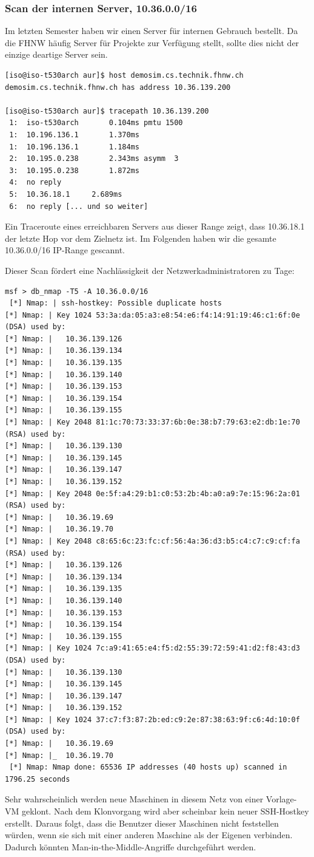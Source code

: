 \documentclass[a4paper,11pt]{scrartcl}
\begin{document}
\subsubsection{Scan der internen Server, 10.36.0.0/16}
Im letzten Semester haben wir einen Server für internen Gebrauch bestellt. Da die FHNW häufig Server für Projekte zur Verfügung stellt, sollte dies nicht der einzige deartige Server sein.
\begin{lstlisting}
[iso@iso-t530arch aur]$ host demosim.cs.technik.fhnw.ch
demosim.cs.technik.fhnw.ch has address 10.36.139.200

[iso@iso-t530arch aur]$ tracepath 10.36.139.200
 1:  iso-t530arch		0.104ms pmtu 1500
 1:  10.196.136.1		1.370ms 
 1:  10.196.136.1		1.184ms
 2:  10.195.0.238		2.343ms asymm  3 
 3:  10.195.0.238		1.872ms 
 4:  no reply
 5:  10.36.18.1		2.689ms 
 6:  no reply [... und so weiter]
\end{lstlisting}
Ein Traceroute eines erreichbaren Servers aus dieser Range zeigt, dass 10.36.18.1 der letzte Hop vor dem Zielnetz ist. Im Folgenden haben wir die gesamte 10.36.0.0/16 IP-Range gescannt.

Dieser Scan fördert eine Nachlässigkeit der Netzwerkadministratoren zu Tage:
\begin{lstlisting}
msf > db_nmap -T5 -A 10.36.0.0/16
 [*] Nmap: | ssh-hostkey: Possible duplicate hosts
[*] Nmap: | Key 1024 53:3a:da:05:a3:e8:54:e6:f4:14:91:19:46:c1:6f:0e (DSA) used by:
[*] Nmap: |   10.36.139.126
[*] Nmap: |   10.36.139.134
[*] Nmap: |   10.36.139.135
[*] Nmap: |   10.36.139.140
[*] Nmap: |   10.36.139.153
[*] Nmap: |   10.36.139.154
[*] Nmap: |   10.36.139.155
[*] Nmap: | Key 2048 81:1c:70:73:33:37:6b:0e:38:b7:79:63:e2:db:1e:70 (RSA) used by:
[*] Nmap: |   10.36.139.130
[*] Nmap: |   10.36.139.145
[*] Nmap: |   10.36.139.147
[*] Nmap: |   10.36.139.152
[*] Nmap: | Key 2048 0e:5f:a4:29:b1:c0:53:2b:4b:a0:a9:7e:15:96:2a:01 (RSA) used by:
[*] Nmap: |   10.36.19.69
[*] Nmap: |   10.36.19.70
[*] Nmap: | Key 2048 c8:65:6c:23:fc:cf:56:4a:36:d3:b5:c4:c7:c9:cf:fa (RSA) used by:
[*] Nmap: |   10.36.139.126
[*] Nmap: |   10.36.139.134
[*] Nmap: |   10.36.139.135
[*] Nmap: |   10.36.139.140
[*] Nmap: |   10.36.139.153
[*] Nmap: |   10.36.139.154
[*] Nmap: |   10.36.139.155
[*] Nmap: | Key 1024 7c:a9:41:65:e4:f5:d2:55:39:72:59:41:d2:f8:43:d3 (DSA) used by:
[*] Nmap: |   10.36.139.130
[*] Nmap: |   10.36.139.145
[*] Nmap: |   10.36.139.147
[*] Nmap: |   10.36.139.152
[*] Nmap: | Key 1024 37:c7:f3:87:2b:ed:c9:2e:87:38:63:9f:c6:4d:10:0f (DSA) used by:
[*] Nmap: |   10.36.19.69
[*] Nmap: |_  10.36.19.70
 [*] Nmap: Nmap done: 65536 IP addresses (40 hosts up) scanned in 1796.25 seconds
\end{lstlisting}
Sehr wahrscheinlich werden neue Maschinen in diesem Netz von einer Vorlage-VM geklont. Nach dem Klonvorgang wird aber scheinbar kein neuer SSH-Hostkey erstellt. Daraus folgt, dass die Benutzer dieser Maschinen nicht feststellen würden, wenn sie sich mit einer anderen Maschine als der Eigenen verbinden. Dadurch könnten Man-in-the-Middle-Angriffe durchgeführt werden.
\end{document}

